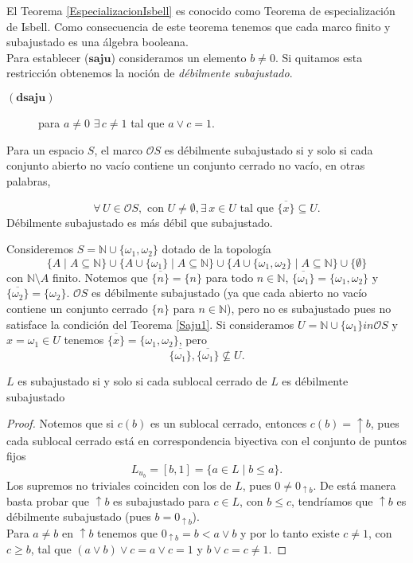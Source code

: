 \documentclass{comunicaciones}
\begin{document}
El Teorema \ref{EspecializacionIsbell} es conocido como Teorema de especialización de Isbell. Como consecuencia de este teorema tenemos que cada marco finito y subajustado es una álgebra booleana.\\

Para establecer ($\textbf{saju}$) consideramos un elemento $b\neq 0$. Si quitamos esta restricción obtenemos la noción de \emph{débilmente subajustado}.

\begin{description}
    \item[$(\textbf{dsaju})$] para $a\neq 0$ $\exists\, c\neq 1$ tal que $a\vee c=1$.
\end{description}

Para un espacio $S$, el marco $\mathcal{O}S$ es débilmente subajustado si y solo si cada conjunto abierto no vacío contiene un conjunto cerrado no vacío, en otras palabras,

\[
\forall\, U\in \mathcal{O}S, \mbox{ con } U\neq \emptyset, \exists\, x\in U \mbox{ tal que } \overline{\{x\}}\subseteq U.
\]
Débilmente subajustado es más débil que subajustado.

\begin{ej}
    Consideremos $S=\mathbb{N}\cup \{\omega_1, \omega_2\}$ dotado de la topología 
    \[
    \{A\mid A\subseteq \mathbb{N}\}\cup \{A\cup \{\omega_1\}\mid A\subseteq \mathbb{N}\}\cup \{A\cup \{\omega_1,\omega_2\}\mid A\subseteq \mathbb{N}\}\cup \{\emptyset\}
    \]
    con $\mathbb{N}\setminus A$ finito. Notemos que $\overline{\{n\}}=\{n\}$ para todo $n\in \mathbb{N}$, $\overline{\{\omega_1\}}=\{\omega_1, \omega_2\}$ y $\overline{\{\omega_2\}}=\{\omega_2\}$. $\mathcal{O}S$ es débilmente subajustado (ya que cada abierto no vacío contiene un conjunto cerrado $\{n\}$ para $n\in \mathbb{N}$), pero no es subajustado pues no satisface la condición del Teorema \ref{Saju1}. Si consideramos $U=\mathbb{N}\cup \{\omega_1\}in \mathcal{O}S$ y $x=\omega_1\in U$ tenemos $\overline{\{x\}}=\{\omega_1,\omega_2\}$, pero 
    \[
    \overline{\{\omega_1\}}, \overline{\{\omega_1\}}\nsubseteq U.
    \]
\end{ej}

\begin{prop}\label{Dsaju}
    $L$ es subajustado si y solo si cada sublocal cerrado de $L$ es débilmente subajustado 
\end{prop}

\begin{proof}
    Notemos que si $c(b)$ es un sublocal cerrado, entonces $c(b)=\uparrow b$, pues cada sublocal cerrado está en correspondencia biyectiva con el conjunto de puntos fijos 
    \[
    L_{u_b}=[b, 1]=\{a\in L\mid b\leq a\}.
    \]
    Los supremos no triviales coinciden con los de $L$, pues $0\neq 0_{\uparrow b}$. De está manera basta probar que $\uparrow b$ es subajustado para $c\in L$, con $b\leq c$, tendríamos que $\uparrow b$ es débilmente subajustado (pues $b=0_{\uparrow b}$).\\
    
    \noindent
    Para $a\neq b$ en $\uparrow b$ tenemos que $0_{\uparrow b} =b< a\vee b$ y por lo tanto existe $c\neq 1$, con $c\geq b$, tal que $(a\vee b)\vee c=a\vee c=1$ y $b\vee c=c\neq 1$.
\end{proof}
\end{document}
